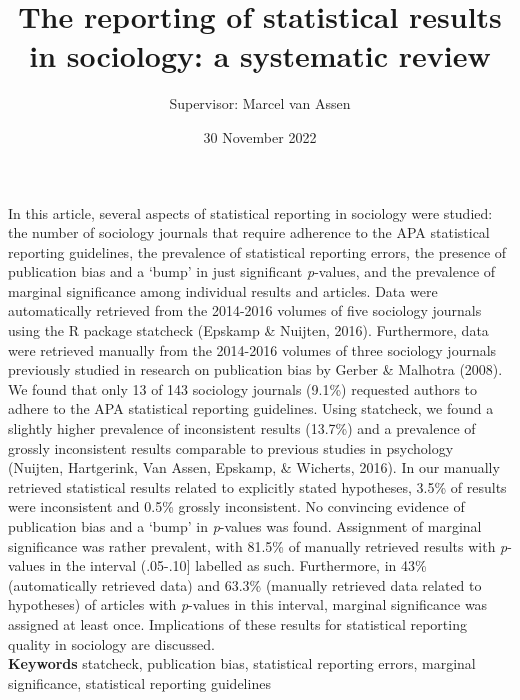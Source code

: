 \documentclass[
  12pt,
]{article}
\title{The reporting of statistical results in sociology: a systematic review}
\author{Supervisor: Marcel van Assen}
\date{30 November 2022}
\begin{document}
\maketitle

\pagebreak

In this article, several aspects of statistical reporting in sociology
were studied: the number of sociology journals that require adherence to
the APA statistical reporting guidelines, the prevalence of statistical
reporting errors, the presence of publication bias and a `bump' in just
significant \emph{p}-values, and the prevalence of marginal significance
among individual results and articles. Data were automatically retrieved
from the 2014-2016 volumes of five sociology journals using the R
package statcheck (Epskamp \& Nuijten, 2016). Furthermore, data were
retrieved manually from the 2014-2016 volumes of three sociology
journals previously studied in research on publication bias by Gerber \&
Malhotra (2008). We found that only 13 of 143 sociology journals (9.1\%)
requested authors to adhere to the APA statistical reporting guidelines.
Using statcheck, we found a slightly higher prevalence of inconsistent
results (13.7\%) and a prevalence of grossly inconsistent results
comparable to previous studies in psychology (Nuijten, Hartgerink, Van
Assen, Epskamp, \& Wicherts, 2016). In our manually retrieved
statistical results related to explicitly stated hypotheses, 3.5\% of
results were inconsistent and 0.5\% grossly inconsistent. No convincing
evidence of publication bias and a `bump' in \emph{p}-values was found.
Assignment of marginal significance was rather prevalent, with 81.5\% of
manually retrieved results with \emph{p}-values in the interval
(.05-.10{]} labelled as such. Furthermore, in 43\% (automatically
retrieved data) and 63.3\% (manually retrieved data related to
hypotheses) of articles with \emph{p}-values in this interval, marginal
significance was assigned at least once. Implications of these results
for statistical reporting quality in sociology are discussed.
\\

\textbf{Keywords} statcheck, publication bias, statistical reporting
errors, marginal significance, statistical reporting guidelines
\pagebreak
\end{document}
